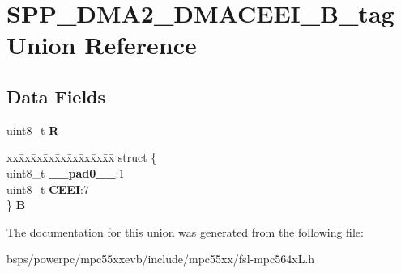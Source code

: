 \hypertarget{unionSPP__DMA2__DMACEEI__8B__tag}{}\section{S\+P\+P\+\_\+\+D\+M\+A2\+\_\+\+D\+M\+A\+C\+E\+E\+I\+\_\+B\+\_\+tag Union Reference}
\label{unionSPP__DMA2__DMACEEI__8B__tag}
\subsection*{Data Fields}
\begin{DoxyCompactItemize}
\item 
\mbox{\label{unionSPP__DMA2__DMACEEI__8B__tag_a432325c99a123f4fe4aa509b7bc44068}} 
uint8\+\_\+t {\bfseries R}
\item 
\mbox{\label{unionSPP__DMA2__DMACEEI__8B__tag_acf1a33f90c0f3a6928ddcd14f2d9f008}} 
\begin{tabbing}
xx\=xx\=xx\=xx\=xx\=xx\=xx\=xx\=xx\=\kill
struct \{\\
\>uint8\_t {\bfseries \_\_pad0\_\_}:1\\
\>uint8\_t {\bfseries CEEI}:7\\
\} {\bfseries B}\\

\end{tabbing}\end{DoxyCompactItemize}


The documentation for this union was generated from the following file\+:\begin{DoxyCompactItemize}
\item 
bsps/powerpc/mpc55xxevb/include/mpc55xx/fsl-\/mpc564x\+L.\+h\end{DoxyCompactItemize}
